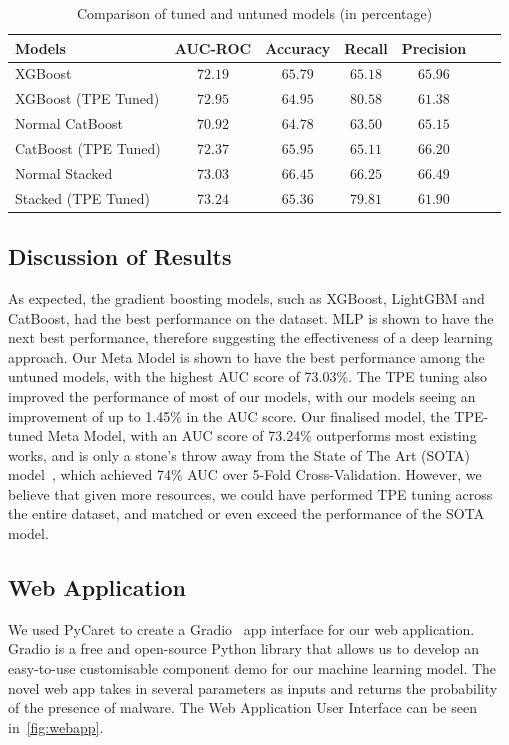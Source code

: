 \documentclass[pdflatex,sn-basic,Numbered]{sn-jnl}%
\theoremstyle{thmstyleone}%
\theoremstyle{thmstyletwo}%
\theoremstyle{thmstylethree}%
\begin{document}
\begin{table}
\centering
\caption{Comparison of tuned and untuned models (in percentage)}
\label{tab:hypertuning}
\begin{tabular}{@{}lcccccc@{}}
\toprule
 \textbf{Models} & \textbf{AUC-ROC} & \textbf{Accuracy} & \textbf{Recall}  & \textbf{Precision} \\ \midrule
XGBoost & $72.19$ & $65.79$ & $65.18$ & $65.96$ \\ %
 XGBoost (TPE Tuned) & $72.95$ & $64.95$ & $\mathbf{80.58}$ & $61.38$ \\ \hline
Normal CatBoost & $70.92$ & $64.78$ & $63.50$ & $65.15$ \\ %
 CatBoost (TPE Tuned) & $72.37$ & $65.95$ & $65.11$ & $66.20$ \\ \hline
 Normal Stacked & $73.03$ & $\mathbf{66.45}$ & $66.25$ & $\mathbf{66.49}$ \\ %
 Stacked (TPE Tuned) & $\mathbf{73.24}$ & $65.36$ & $79.81$ & $61.90$ \\ \bottomrule %
\end{tabular}%
\vspace{-2ex}
\end{table}


\subsection{Discussion of Results}\label{subsec:discussion-of-results}
As expected, the gradient boosting models, such as XGBoost, LightGBM and CatBoost, had the best performance on the dataset.
MLP is shown to have the next best performance, therefore suggesting the effectiveness of a deep learning approach.
Our Meta Model is shown to have the best performance among the untuned models, with the highest AUC score of 73.03\%.
The TPE tuning also improved the performance of most of our models, with our models seeing an improvement of up to 1.45\% in the AUC score.
Our finalised model, the TPE-tuned Meta Model, with an AUC score of 73.24\% outperforms most existing works, and is only a stone's throw away from the State of The Art (SOTA) model~\cite{shahini2019}, which achieved 74\% AUC over 5-Fold Cross-Validation.
However, we believe that given more resources, we could have performed TPE tuning across the entire dataset, and matched or even exceed the performance of the SOTA model.

\subsection{Web Application}\label{subsec:web-application}
We used PyCaret to create a Gradio~\cite{gradio} app interface for our web application.
Gradio is a free and open-source Python library that allows us to develop an easy-to-use customisable component demo for our machine learning model.
The novel web app takes in several parameters as inputs and returns the probability of the presence of malware.
The Web Application User Interface can be seen in~\ref{fig:webapp}.
\end{document}
